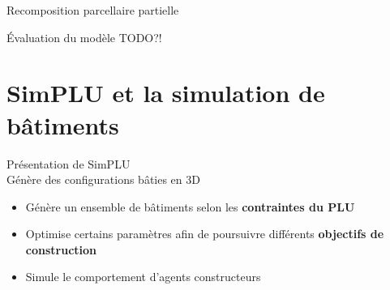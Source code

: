 \documentclass[xcolor=table]{beamer}
\begin{document}

\begin{frame}{Recomposition parcellaire partielle}
\end{frame}

\begin{frame}{Évaluation du modèle}
	TODO?! %
\end{frame}

\section[SimPLU]{SimPLU et la simulation de bâtiments}



\begin{frame}{Présentation de SimPLU}
	\\
	Génère des configurations bâties en 3D
	\begin{itemize}
		\item Génère un ensemble de bâtiments selon les \textbf{contraintes du PLU}
		\item Optimise certains paramètres afin de poursuivre différents \textbf{objectifs de construction}
		\item Simule le comportement d'agents constructeurs
	\end{itemize} 
\end{frame}
\end{document}
